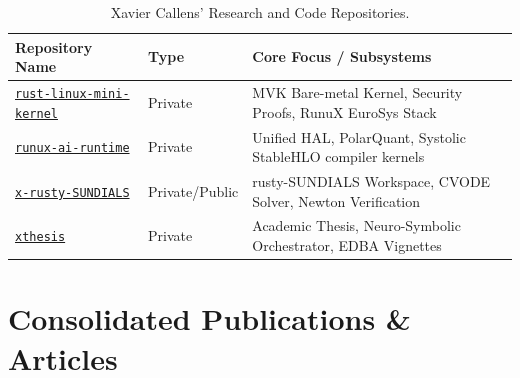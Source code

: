 \documentclass[11pt,a4paper]{article}
\begin{document}
\begin{table}[h]
\centering
\small
\begin{tabular}{lll}
\toprule
\textbf{Repository Name} & \textbf{Type} & \textbf{Core Focus / Subsystems} \\
\midrule
\href{https://github.com/xaviercallens/rust-linux-mini-kernel}{\texttt{rust-linux-mini-kernel}} & Private & MVK Bare-metal Kernel, Security Proofs, RunuX EuroSys Stack \\
\href{https://github.com/xaviercallens/runux-ai-runtime}{\texttt{runux-ai-runtime}} & Private & Unified HAL, PolarQuant, Systolic StableHLO compiler kernels \\
\href{https://github.com/xaviercallens/x-rusty-SUNDIALS}{\texttt{x-rusty-SUNDIALS}} & Private/Public & rusty-SUNDIALS Workspace, CVODE Solver, Newton Verification \\
\href{https://github.com/xaviercallens/xthesis}{\texttt{xthesis}} & Private & Academic Thesis, Neuro-Symbolic Orchestrator, EDBA Vignettes \\
\bottomrule
\end{tabular}
\caption{Xavier Callens' Research and Code Repositories.}
\label{tab:repos}
\end{table}

\section{Consolidated Publications \& Articles}
\end{document}
